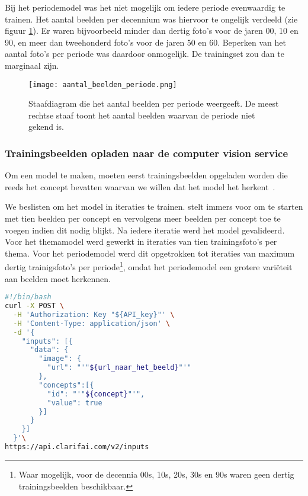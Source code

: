 Bij het periodemodel was het niet mogelijk om iedere periode evenwaardig te trainen. Het aantal beelden per decennium was hiervoor te ongelijk verdeeld (zie figuur \ref{fig:aantal-beelden-periode}). Er waren bijvoorbeeld minder dan dertig foto’s voor de jaren 00, 10 en 90, en meer dan tweehonderd foto’s voor de jaren 50 en 60. Beperken van het aantal foto’s per periode was daardoor onmogelijk. De trainingset zou dan  te marginaal zijn.

\begin{figure}
	\centering
	\texttt{[image: aantal\_beelden\_periode.png]}\hfill
	\caption[Staafdiagram met het aantal beelden per periode]{Staafdiagram die het aantal beelden per periode weergeeft. De meest rechtse staaf toont het aantal beelden waarvan de periode niet gekend is.}
	\label{fig:aantal-beelden-periode}
\end{figure}


\subsubsection{Trainingsbeelden opladen naar de computer vision service}
\label{subsubsec:trainingsbeelden-opladen}

Om een model te maken, moeten eerst trainingsbeelden opgeladen worden die reeds het concept bevatten waarvan we willen dat het model het herkent~\autocite{ClarifaiAPI}. 

We beslisten om het model in iteraties te trainen. \textcite{ClarifaiAPI} stelt immers voor om te starten met tien beelden per concept en vervolgens meer beelden per concept toe te voegen indien dit nodig blijkt. Na iedere iteratie werd het model gevalideerd. Voor het themamodel werd gewerkt in iteraties van tien trainingsfoto’s per thema. Voor het periodemodel werd dit opgetrokken tot iteraties van maximum dertig trainigsfoto’s per periode\footnote{Waar mogelijk, voor de decennia 00s, 10s, 20s, 30s en 90s waren geen dertig trainingsbeelden beschikbaar.}, omdat het periodemodel een grotere variëteit aan beelden moet herkennen.



\begin{lstlisting}[language=bash,caption=bash commando om een beeld met een concept naar Clarifai op te laden.]
#!/bin/bash
curl -X POST \
  -H 'Authorization: Key "${API_key}"' \
  -H 'Content-Type: application/json' \
  -d '{
    "inputs": [{
      "data": {
        "image": {
          "url": "'"${url_naar_het_beeld}"'"
        },
        "concepts":[{
          "id": "'"${concept}"'",
          "value": true
        }]
      }
    }]
  }'\
https://api.clarifai.com/v2/inputs
\end{lstlisting}

